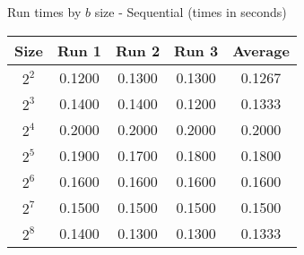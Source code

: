 \centering
\caption{\label{table:matrix_seq}Run times by $b$ size - Sequential (times in seconds)}
\begin{tabular}{@{} c c c c c @{}}
\toprule
    \textbf{Size} & \textbf{Run 1}& \textbf{Run 2}& \textbf{Run 3}& \textbf{Average}\\
\midrule
    $2^2$ & 0.1200 & 0.1300 & 0.1300 & 0.1267\\
\lightrule
    $2^3$ & 0.1400 & 0.1400 & 0.1200 & 0.1333\\
\lightrule
    $2^4$ & 0.2000 & 0.2000 & 0.2000 & 0.2000\\
\lightrule
    $2^5$ & 0.1900 & 0.1700 & 0.1800 & 0.1800\\
\lightrule
    $2^6$ & 0.1600 & 0.1600 & 0.1600 & 0.1600\\
\lightrule
    $2^7$ & 0.1500 & 0.1500 & 0.1500 & 0.1500\\
\lightrule
    $2^8$ & 0.1400 & 0.1300 & 0.1300 & 0.1333\\
\bottomrule
\end{tabular}
